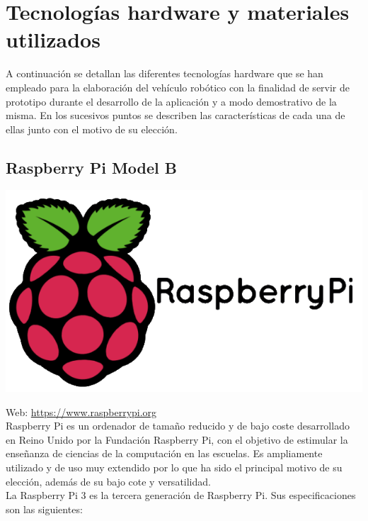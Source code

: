 \section{Tecnologías hardware y materiales utilizados}
\label{sec:tecnologias-hardware}


A continuación se detallan las diferentes tecnologías hardware que se han
empleado para la elaboración del vehículo robótico con la finalidad de servir de prototipo durante el desarrollo de la aplicación y a modo demostrativo de la misma. En los sucesivos puntos
se describen las características de cada una de ellas junto con el motivo de su elección.


\subsection{Raspberry Pi Model B}
\label{sec:raspberry}


\begin{center}
\includegraphics[scale=0.3]{imagenes/RaspberryPi-logo.png}
\end{center}

Web: \url{https://www.raspberrypi.org}\\

Raspberry Pi es un ordenador de tamaño reducido y de bajo coste desarrollado en Reino Unido por la Fundación Raspberry Pi, con el objetivo de estimular la enseñanza de ciencias de la computación
en las escuelas. Es ampliamente utilizado y de uso muy extendido por lo que ha sido el principal motivo de su elección, además de su bajo cote y versatilidad.\\

La Raspberry Pi 3 es la tercera generación de Raspberry Pi. Sus especificaciones son las siguientes:

